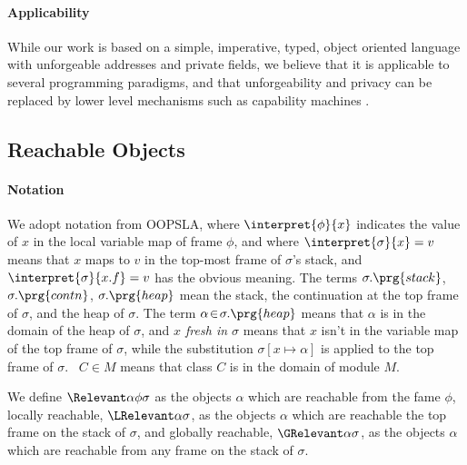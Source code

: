 \paragraph{Applicability} 
{While our work is based on 
  a simple, imperative, typed, object oriented}
language with unforgeable addresses and private fields, we believe
 that %
 it is applicable to several programming paradigms, and 
 that   unforgeability and privacy
 can be replaced 
 by lower level mechanisms such as capability machines \cite{vanproving,davis2019cheriabi}.

  \subsection{{Reachable  Objects}}
  
 

\paragraph{Notation} We adopt notation from OOPSLA, where
 $\interpret{\phi}{x}$  indicates the value of $x$   in the local variable map of frame $\phi$, 
 and where $\interpret{\sigma}{x} = v$ means that $x$ 
maps to $v$ in the top-most frame of $\sigma$'s stack, and $\interpret{\sigma}{x.f} = v$
has the obvious meaning. The terms $\sigma.\prg{stack}$,  
$\sigma.\prg{contn}$,  
$\sigma.\prg{heap}$     mean the stack, 
the continuation at the
top frame of $\sigma$, %
and the heap of $\sigma$.
The term $\alpha\!\in\!\sigma.\prg{heap}$ means that $\alpha$ is in the domain of the heap of $\sigma$, and \emph{$x$ fresh in $\sigma$} means that 
$x$ isn't in the variable map of the top frame of $\sigma$, 
while the substitution  $\sigma[x \mapsto \alpha]$ is applied to the top frame of $\sigma$.
 \ $C\in M$ means that class $C$ is in the domain of module $M$. 


We define  $\Relevant \alpha \phi \sigma $ as the objects $\alpha$ which are reachable from   the fame $\phi$,
locally reachable, $ \LRelevant \alpha \sigma $, as  the objects  $\alpha$ which are reachable the top frame on the stack of $\sigma$,
and globally reachable, $\GRelevant \alpha \sigma$, as the objects  $\alpha$ which  are reachable from any  frame on the stack of $\sigma$.
 
